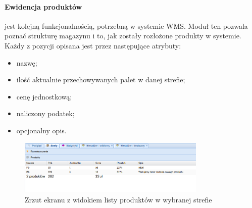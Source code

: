 		\paragraph{Ewidencja produktów} jest kolejną funkcjonalnością, potrzebną w systemie WMS.
		Moduł ten pozwala poznać strukturę magazynu i to, jak zostały rozłożone produkty w systemie.
		Każdy z pozycji opisana jest przez następujące atrybuty: 
		\begin{itemize}
			\item nazwę;
			\item ilość aktualnie przechowywanych palet w danej strefie;
			\item cenę jednostkową;
			\item naliczony podatek;
			\item opcjonalny opis.
		\end{itemize}
		\begin{figure}[H]
			\centering
			\includegraphics[width=0.8\textwidth]{images/app/unit_products_preview}
			\caption[Aplikacja - Ewidencja towarów w poszczególnych strefach]{Zrzut ekranu z widokiem listy produktów w wybranej strefie}
			\label{c7:fig:app:unit_products_preview}
		\end{figure}
		
